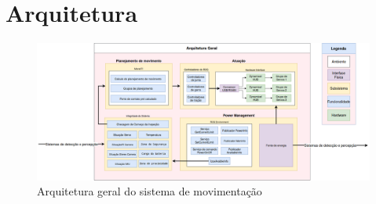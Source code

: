 
\chapter{Arquitetura}
\label{Append:arquiteturaA}


\begin{figure}[H]
	\centering
	\includegraphics[scale=0.32, angle=270]{Figures/ArquiteturaPORTUGUES.png}
	\caption{Arquitetura geral do sistema de movimentação}
	\label{fig:arq_geral}
\end{figure}